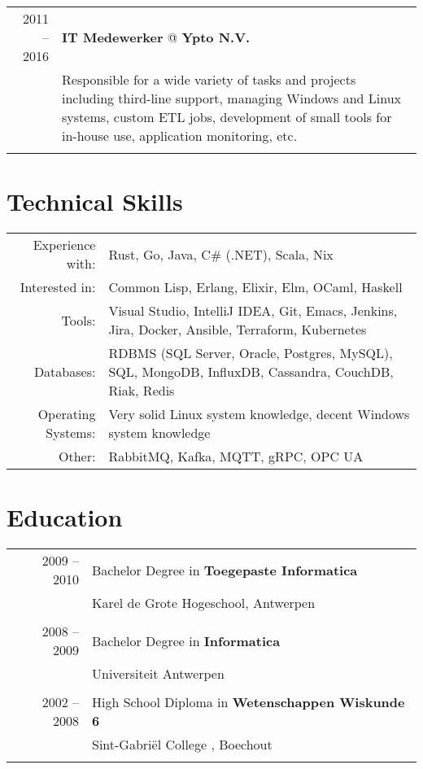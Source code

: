 \documentclass[a4paper,10pt]{article}
\begin{document}
\begin{tabular}{r|p{11cm}}
        
	\textsc{2011 – 2016} & \textbf{IT Medewerker} @ \textbf{Ypto N.V.} \\
	& \footnotesize{Responsible for a wide variety of tasks and projects including third-line support, managing Windows and Linux systems, custom ETL jobs, development of small tools for in-house use, application monitoring, etc.} \\
	\multicolumn{2}{c}{} \\
\end{tabular}

\section{\textcolor{awesome-red}{Tec}hnical Skills}
\begin{tabular}{rp{11cm}}
Experience with:& Rust, Go, Java, C\# (.NET), Scala, Nix\\
Interested in:& Common Lisp, Erlang, Elixir, Elm, OCaml, Haskell\\
Tools:& Visual Studio, IntelliJ IDEA, Git, Emacs, Jenkins, Jira, Docker, Ansible, Terraform, Kubernetes\\
Databases:& RDBMS (SQL Server, Oracle, Postgres, MySQL), SQL, MongoDB, InfluxDB, Cassandra, CouchDB, Riak, Redis\\
Operating Systems:& Very solid Linux system knowledge, decent Windows system knowledge\\
Other:& RabbitMQ, Kafka, MQTT, gRPC, OPC UA
\end{tabular}
\newline
\newline

\section{\textcolor{awesome-red}{Edu}cation}
\begin{tabular}{rl}	
2009 – 2010& Bachelor Degree in \textbf{Toegepaste Informatica}\\
& Karel de Grote Hogeschool, Antwerpen\\&\\
2008 – 2009& Bachelor Degree in \textbf{Informatica}\\
& Universiteit Antwerpen\\&\\
2002 – 2008& High School Diploma in \textbf{Wetenschappen Wiskunde 6}\\
& Sint-Gabriël College , Boechout\\&\\
\end{tabular}
\end{document}
